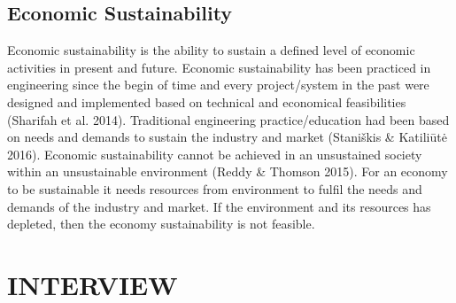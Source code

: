 \documentclass{article}
\begin{document}
\subsection{Economic Sustainability }\label{sec:ECO}
Economic sustainability is the ability to sustain a defined level of economic activities in present and future. Economic sustainability has been practiced in engineering since the begin of time and every project/system in the past were designed and implemented based on technical and economical feasibilities (Sharifah et al. 2014). Traditional engineering practice/education had been based on needs and demands to sustain the industry and market (Staniškis \& Katiliūtė 2016). Economic sustainability cannot be achieved in an unsustained society within an unsustainable environment (Reddy \& Thomson 2015). For an economy to be sustainable it needs resources from environment to fulfil the needs and demands of the industry and market.  If the environment and its resources has depleted, then the economy sustainability is not feasible.
\section{INTERVIEW}
\end{document}
